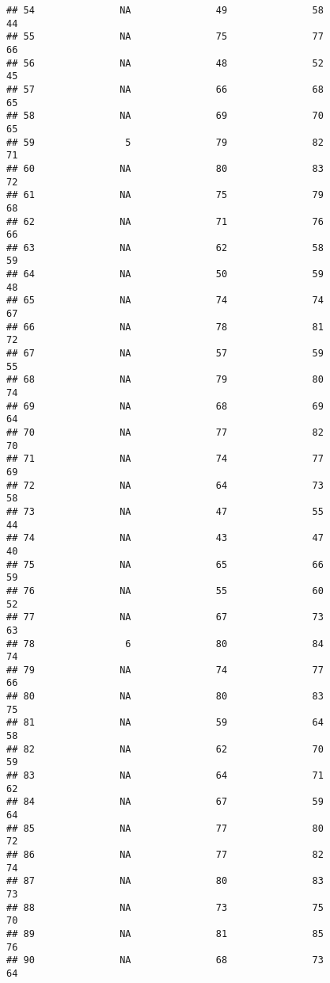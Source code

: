 \documentclass[]{article}
\begin{document}
\begin{verbatim}
## 54               NA               49               58             44
## 55               NA               75               77             66
## 56               NA               48               52             45
## 57               NA               66               68             65
## 58               NA               69               70             65
## 59                5               79               82             71
## 60               NA               80               83             72
## 61               NA               75               79             68
## 62               NA               71               76             66
## 63               NA               62               58             59
## 64               NA               50               59             48
## 65               NA               74               74             67
## 66               NA               78               81             72
## 67               NA               57               59             55
## 68               NA               79               80             74
## 69               NA               68               69             64
## 70               NA               77               82             70
## 71               NA               74               77             69
## 72               NA               64               73             58
## 73               NA               47               55             44
## 74               NA               43               47             40
## 75               NA               65               66             59
## 76               NA               55               60             52
## 77               NA               67               73             63
## 78                6               80               84             74
## 79               NA               74               77             66
## 80               NA               80               83             75
## 81               NA               59               64             58
## 82               NA               62               70             59
## 83               NA               64               71             62
## 84               NA               67               59             64
## 85               NA               77               80             72
## 86               NA               77               82             74
## 87               NA               80               83             73
## 88               NA               73               75             70
## 89               NA               81               85             76
## 90               NA               68               73             64

\end{verbatim}
\end{document}
